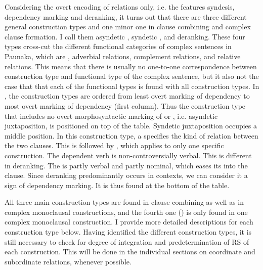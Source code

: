 Considering the overt encoding of relations only, i.e. the features syndesis, dependency marking and deranking, it turns out that there are three different general construction types and one minor one in clause combining and complex clause formation. I call them asyndetic , syndetic ,  and deranking. These four types cross-cut the different functional categories of complex sentences in Paunaka, which are , adverbial relations, complement relations, and relative relations. This means that there is usually no one-to-one correspondence between construction type and functional type of the complex sentence, but it also not the case that that each of the functional types is found with all construction types. In , the construction types are ordered from least overt marking of dependency to most overt marking of dependency (first column). Thus the construction type that includes no overt morphosyntactic marking of  or , i.e. asyndetic juxtaposition, is positioned on top of the table. Syndetic juxtaposition occupies a middle position. In this construction type, a  specifies the kind of relation between the two clauses. This is followed by , which applies to only one specific construction. The dependent verb is non-controversially verbal. This is different in deranking. The  is partly verbal and partly nominal, which eases its  into the clause. Since deranking predominantly occurs in  contexts, we can consider it a sign of dependency marking. It is thus found at the bottom of the table. 

All three main construction types are found in clause combining as well as in complex monoclausal constructions, and the fourth one () is only found in one complex monoclausal construction. I provide more detailed descriptions for each construction type below. Having identified the different construction types, it is still necessary to check for degree of integration and predetermination of RS of each construction. This will be done in the individual sections on coordinate and subordinate relations, whenever possible. 


